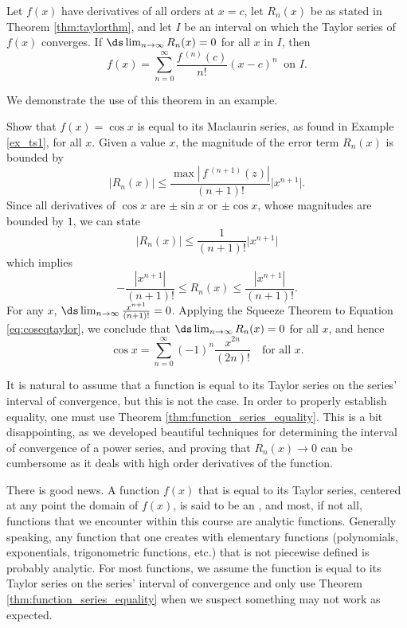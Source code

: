 {Let $f(x)$ have derivatives of all orders at $x=c$, let $R_n(x)$ be as stated in Theorem \ref{thm:taylorthm}, and let $I$ be an interval on which the Taylor series of $f(x)$ converges. 
If $\ds\lim_{n\to\infty} R_n(x) = 0$ for all $x$ in $I$, then 
$$f(x) = \sum_{n=0}^\infty \frac{f\,^{(n)}(c)}{n!}(x-c)^n\ \text{ on $I$.}$$
}

We demonstrate the use of this theorem in an example.

{Show that $f(x) = \cos x$ is equal to its Maclaurin series, as found in Example \ref{ex_ts1}, for all $x$. 
}
{Given a value $x$, the magnitude of the error term $R_n(x)$ is bounded by
$$ \big|R_n(x)\big| \leq \frac{\max\left|\,f\,^{(n+1)}(z)\right|}{(n+1)!}\big|x^{n+1}\big|.$$
Since all derivatives of $\cos x$ are $\pm \sin x$ or $\pm\cos x$, whose magnitudes are bounded by $1$, we can state
$$ \big|R_n(x)\big| \leq \frac{1}{(n+1)!}\big|x^{n+1}\big|$$
which implies
\begin{equation}
 -\frac{|x^{n+1}|}{(n+1)!} \leq R_n(x) \leq\frac{|x^{n+1}|}{(n+1)!}.\label{eq:coseqtaylor}
\end{equation}
For any $x$, $\ds\lim_{n\to\infty} \frac{x^{n+1}}{(n+1)!} = 0$. Applying the Squeeze Theorem to Equation \eqref{eq:coseqtaylor}, we conclude that $\ds \lim_{n\to\infty} R_n(x) = 0$ for all $x$, and hence
$$\cos x = \sum_{n=0}^\infty (-1)^{n}\frac{x^{2n}}{(2n)!}\quad \text{for all $x$}.$$}

It is natural to assume that a function is  equal to its Taylor series on the series' interval of convergence, but this is not the case. In order to properly establish equality, one must use Theorem \ref{thm:function_series_equality}. This is a bit disappointing, as we developed beautiful techniques for determining the interval of convergence of a power series, and proving that $R_n(x)\to 0$ can be cumbersome as it deals with high order derivatives of the function.

There is good news. A function $f(x)$ that is equal to its Taylor series, centered at any point the domain of $f(x)$, is said to be an , and most, if not all, functions that we encounter within this course are analytic functions. Generally speaking, any function that one creates with elementary functions (polynomials, exponentials, trigonometric functions, etc.) that is not piecewise defined is probably analytic. For most functions, we assume the function is equal to its Taylor series on the series' interval of convergence and only use Theorem \ref{thm:function_series_equality} when we suspect something may not work as expected.

